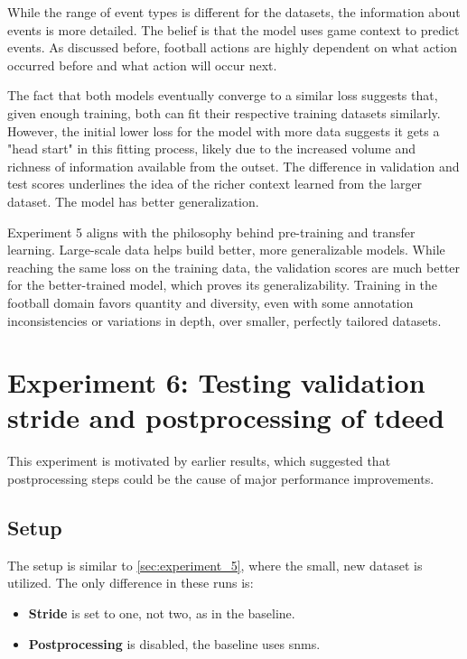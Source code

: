 While the range of event types is different for the datasets, the information about events is more detailed. The belief is that the model uses game context to predict events. As discussed  before, football actions are highly dependent on what action occurred before and what action will occur next. 



The fact that both models eventually converge to a similar loss suggests that, given enough training, both can fit their respective training datasets similarly. However, the initial lower loss for the model with more data suggests it gets a "head start" in this fitting process, likely due to the increased volume and richness of information available from the outset. The difference in validation and test scores underlines the idea of the richer context learned from the larger dataset. The model has better generalization. 


Experiment 5 aligns with the philosophy behind pre-training and transfer learning. Large-scale data helps build better, more generalizable models. While reaching the same loss on the training data, the validation scores are much better for the better-trained model, which proves its generalizability. Training in the football domain favors quantity and diversity, even with some annotation inconsistencies or variations in depth, over smaller, perfectly tailored datasets.


\section{Experiment 6: Testing validation stride and postprocessing of \acrshort{tdeed}}
\label{sec:experiment_6}

This experiment is motivated by earlier results, which suggested that postprocessing steps could be the cause of major performance improvements. 

\subsection{Setup}
\label{ssec:ex6_setup}
The setup is similar to \cref{sec:experiment_5}, where the small, new dataset is utilized. The only difference in these runs is:

\begin{itemize}
    \item \textbf{Stride} is set to one, not two, as in the baseline.
    \item \textbf{Postprocessing} is disabled, the baseline uses \acrlong{snms}.
\end{itemize}

